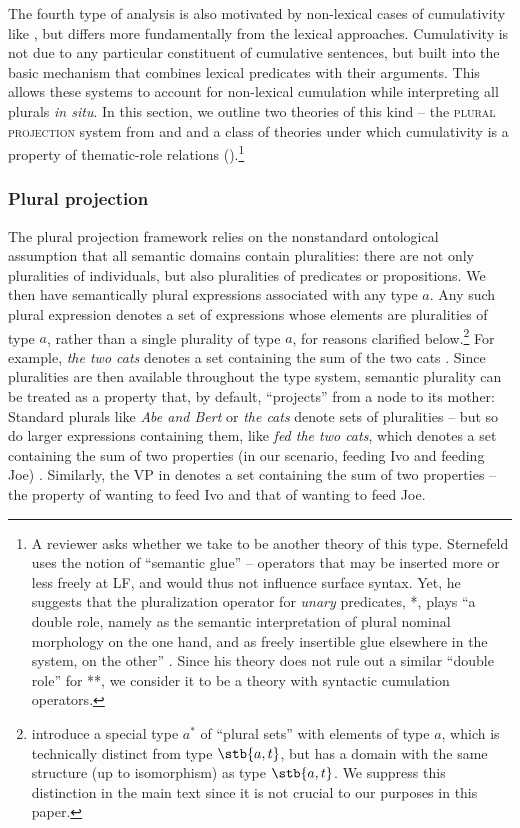 \documentclass[output=paper]{langscibook}
\begin{document}
The fourth type of analysis is also motivated by non-lexical cases of cumulativity like , but differs more fundamentally from the lexical approaches. Cumulativity is not due to any particular constituent of cumulative sentences, but built into the basic mechanism that combines lexical predicates with their arguments. This allows these systems to account for non-lexical cumulation while interpreting all plurals \textit{in situ}. In this section, we outline two theories of this kind -- the \textsc{plural projection} system from \citet{Schmitt:2019} and \citet{Haslinger:2018a} and a class of theories under which cumulativity is a property of thematic-role relations (\citealt{Schein:1993,Landman:1996,Landman:2000,Kratzer:2003,Kratzer:2008,Ferreira:2005,Zweig:2008,Zweig:2009}).\footnote{A reviewer asks whether we take \citet{Sternefeld:1998} to be another theory of this type. Sternefeld uses the notion of 
``semantic glue'' -- operators that may be inserted more or less freely at LF, and would thus not influence surface syntax. Yet, he suggests that the pluralization operator for \textit{unary} predicates, *, plays ``a double role, namely as the semantic interpretation of plural nominal morphology on the one hand, and as freely insertible glue elsewhere in the system, on the other'' \citep[314, fn.~7]{Sternefeld:1998}. Since his theory does not rule out a similar ``double role'' for **, we consider it to be a theory with syntactic cumulation operators.}

\subsubsection{Plural projection}

The plural projection framework relies on the nonstandard ontological assumption that all semantic domains contain pluralities: there are not only pluralities of individuals, but also pluralities of predicates or propositions. We then have semantically plural expressions associated with any type $a$. Any such plural expression denotes a set of expressions whose elements are pluralities of type $a$, rather than a single plurality of type $a$, for reasons clarified below.\footnote{\citet{Haslinger:2018a} introduce a special type $a^*$ of ``plural sets'' with elements of type $a$, which is technically distinct from type $\stb{a, t}$, but has a domain with the same structure (up to isomorphism) as type $\stb{a, t}$. We suppress this distinction in the main text since it is not crucial to our purposes in this paper.} 
For example, \textit{the two cats} denotes a set containing the sum of the two cats . Since pluralities are then available throughout the type system, semantic plurality can be treated as a property that, by default, ``projects'' from a node to its mother: Standard plurals like \textit{Abe and Bert} or \textit{the cats} denote sets of pluralities -- but so do larger expressions containing them, like \textit{fed the two cats}, which denotes a set containing the sum of two properties (in our scenario, feeding Ivo and feeding Joe) . Similarly, the VP in  denotes a set containing the sum of two properties -- the property of wanting to feed Ivo and that of wanting to feed Joe.
\end{document}
